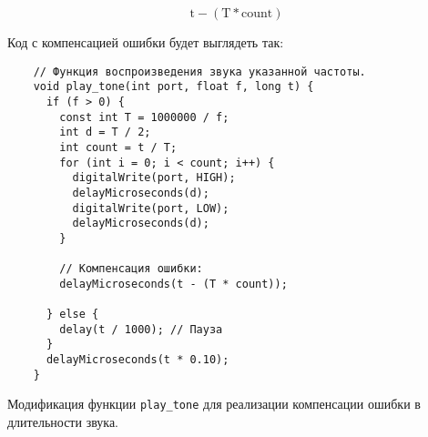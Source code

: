 \documentclass[../sparc.tex]{subfiles}
\begin{document}
\begin{equation}
  \mbox{t} - (\mbox{T} * \mbox{count})
\end{equation}

Код с компенсацией ошибки будет выглядеть так:

\begin{listing}[!h]
  \begin{verbatim}
    // Функция воспроизведения звука указанной частоты.
    void play_tone(int port, float f, long t) {
      if (f > 0) {
        const int T = 1000000 / f;
        int d = T / 2;
        int count = t / T;
        for (int i = 0; i < count; i++) {
          digitalWrite(port, HIGH);
          delayMicroseconds(d);
          digitalWrite(port, LOW);
          delayMicroseconds(d);
        }

        // Компенсация ошибки:
        delayMicroseconds(t - (T * count));

      } else {
        delay(t / 1000); // Пауза
      }
      delayMicroseconds(t * 0.10);
    }
  \end{verbatim}
  \label{listing:music-band-play-tone-with-error-compensation}
  \caption{Модификация функции \texttt{play\_tone} для реализации компенсации
    ошибки в длительности звука.}
\end{listing}
\end{document}
